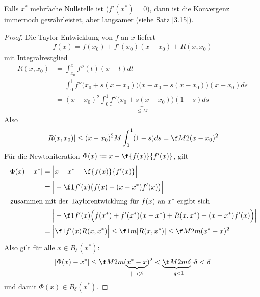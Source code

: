 \documentclass[11pt]{scrbook}
\begin{document}
\begin{st}
\begin{note}
\begin{itemize}
				Falls $x^*$ mehrfache Nullstelle ist ($f'(x^*)=0$), dann ist die Konvergenz immernoch gewährleistet, aber langsamer (siehe Satz \ref{3.15}).
		\end{itemize}
		\begin{proof}
			Die Taylor-Entwicklung von $f$ an $x$ liefert
			\begin{align*}
				f(x) = f(x_0) + f'(x_0)(x-x_0) + R(x,x_0)
			\end{align*}
			mit Integralrestglied
			\begin{align*}
				R(x,x_0) 
				&= \int_{x_0}^x f''(t) (x-t) dt \\
				&= \int_0^1 f''\Big(x_0+s(x-x_0)\Big)  \Big(x-x_0-s(x-x_0)\Big)(x-x_0) ds \\
				&= (x-x_0)^2 \int_0^1 \underbrace{f''\big(x_0+s(x-x_0)\big)}_{\le M} (1-s) ds
			\end{align*}
			Also
			\[
				|R(x,x_0) | \le (x-x_0)^2 M \int_0^1 (1-s) ds = \f M2 (x-x_0)^2
			\]
			Für die Newtoniteration $\Phi(x) := x - \f {f(x)}{f'(x)}$, gilt
			\begin{align*}
				|\Phi(x) - x^*|
				&= \Big|x-x^* - \f {f(x)}{f'(x)}\Big| \\
				&= \Big| -\f 1{f'(x)} \big(f(x) + (x-x^*)f'(x) \big) \Big| \\
			\intertext{
				zusammen mit der Taylorentwicklung für $f(x)$ an $x^*$ ergibt sich
			}
				&= \Big| -\f 1{f'(x)} \Big(f(x^*) + f'(x^*)(x-x^*) + R(x,x^*) + (x-x^*)f'(x)\Big) \Big| \\
				&= \Big| \f 1{f'(x)} R(x,x^*) \Big| 
				\le \f 1m |R(x,x^*)| 
				\le \f M{2m} (x^* - x)^2
			\end{align*}
			Also gilt für alle $x\in B_\delta(x^*)$:
			\[
				|\Phi(x) - x^*| \le \f M{2m}(\underbrace{x^*-x}_{|\cdot|<\delta})^2 < \underbrace{\f M{2m} \delta}_{=q<1} \cdot \delta < \delta
			\]
			und damit $\Phi(x) \in B_\delta(x^*)$.


\end{proof}
\end{note}
\end{st}
\end{document}
